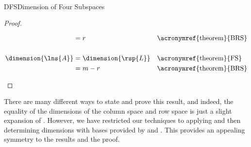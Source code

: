 \begin{subsect}{DFS}{Dimension of Four Subspaces}
\begin{proof}
\begin{para}
\begin{align*}
&=r&&\text{\acronymref{theorem}{BRS}}\\
\ \\
\dimension{\lns{A}}
&=\dimension{\rsp{L}}&&\text{\acronymref{theorem}{FS}}\\
&=m-r&&\text{\acronymref{theorem}{BRS}}\\
\end{align*}
\end{para}
%
\end{proof}
%
\begin{para}There are many different ways to state and prove this result, and indeed, the equality of the dimensions of the column space and row space is just a slight expansion of .  However, we have restricted our techniques to applying  and then determining dimensions with bases provided by  and .  This provides an appealing symmetry to the results and the proof.\end{para}
%
%
\end{subsect}
%
